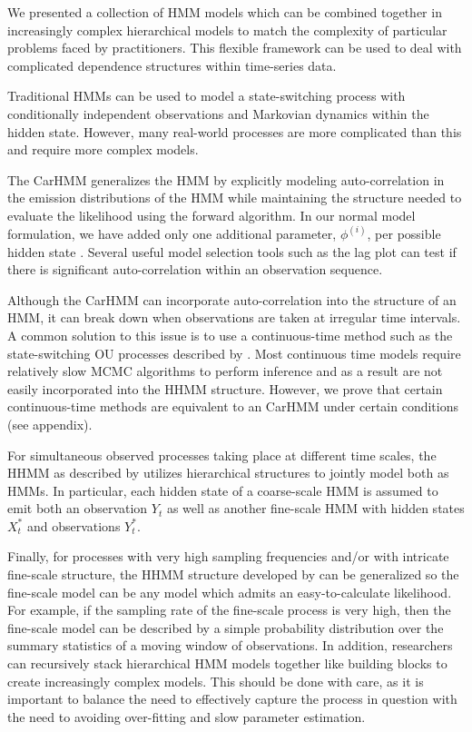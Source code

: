 

We presented a collection of HMM models which can be combined together in increasingly complex hierarchical models to match the complexity of particular problems faced by practitioners. This flexible framework can be used to deal with complicated dependence structures within time-series data.

Traditional HMMs can be used to model a state-switching process with conditionally independent observations and Markovian dynamics within the hidden state. However, many real-world processes are more complicated than this and require more complex models.

The CarHMM generalizes the HMM by explicitly modeling auto-correlation in the emission distributions of the HMM while maintaining the structure needed to evaluate the likelihood using the forward algorithm. In our normal model formulation, we have added only one additional parameter, $\phi^{(i)}$, per possible hidden state \citep{Lawler:2019}. Several useful model selection tools such as the lag plot can test if there is significant auto-correlation within an observation sequence.

Although the CarHMM can incorporate auto-correlation into the structure of an HMM, it can break down when observations are taken at irregular time intervals. A common solution to this issue is to use a continuous-time method such as the state-switching OU processes described by \citep{Michelot:2019}. Most continuous time models require relatively slow MCMC algorithms to perform inference and as a result are not easily incorporated into the HHMM structure. However, we prove that certain continuous-time methods are equivalent to an CarHMM under certain conditions (see appendix).

For simultaneous observed processes taking place at different time scales, the HHMM as described by \citep{Barajas:2017,Adam:2019} utilizes hierarchical structures to jointly model both as HMMs. In particular, each hidden state of a coarse-scale HMM is assumed to emit both an observation $Y_t$ as well as another fine-scale HMM with hidden states $X^*_t$ and observations $Y^*_t$. 

Finally, for processes with very high sampling frequencies and/or with intricate fine-scale structure, the HHMM structure developed by \citep{Barajas:2017,Adam:2019} can be generalized so the fine-scale model can be any model which admits an easy-to-calculate likelihood. For example, if the sampling rate of the fine-scale process is very high, then the fine-scale model can be described by a simple probability distribution over the summary statistics of a moving window of observations. In addition, researchers can recursively stack hierarchical HMM models together like building blocks to create increasingly complex models. This should be done with care, as it is important to balance the need to effectively capture the process in question with the need to avoiding over-fitting and slow parameter estimation.

